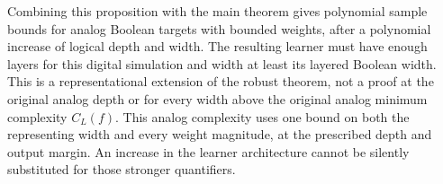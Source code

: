 Combining this proposition with the main theorem gives polynomial sample
bounds for analog Boolean targets with bounded weights, after a
polynomial increase of logical depth and width. The resulting learner
must have enough layers for this digital simulation and width at least
its layered Boolean width. This is a representational extension of the
robust theorem, not a proof at the original analog depth or for every
width above the original analog minimum complexity $C_L(f)$.
This analog complexity uses one bound on both the representing width
and every weight magnitude, at the prescribed depth and output margin.
An increase in the learner architecture cannot be silently substituted
for those stronger quantifiers.
